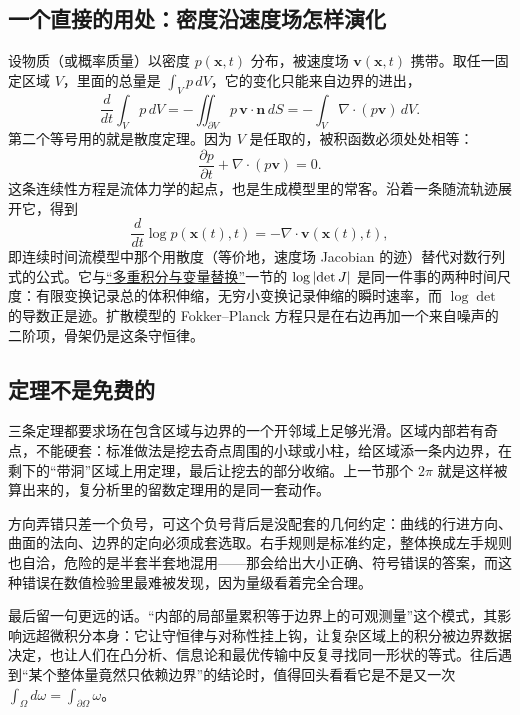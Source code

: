 \subsection{一个直接的用处：密度沿速度场怎样演化}

设物质（或概率质量）以密度 \(p(\mathbf x,t)\) 分布，被速度场 \(\mathbf v(\mathbf x,t)\) 携带。取任一固定区域 \(V\)，里面的总量是 \(\int_V p\,dV\)，它的变化只能来自边界的进出，
\[
\frac{d}{dt}\int_V p\,dV=-\iint_{\partial V}p\,\mathbf v\cdot\mathbf n\,dS
=-\int_V\nabla\cdot(p\mathbf v)\,dV .
\]
第二个等号用的就是散度定理。因为 \(V\) 是任取的，被积函数必须处处相等：
\[
\frac{\partial p}{\partial t}+\nabla\cdot(p\mathbf v)=0 .
\]
这条连续性方程是流体力学的起点，也是生成模型里的常客。沿着一条随流轨迹展开它，得到
\[
\frac{d}{dt}\log p(\mathbf x(t),t)=-\nabla\cdot\mathbf v(\mathbf x(t),t),
\]
即连续时间流模型中那个用散度（等价地，速度场 Jacobian 的迹）替代对数行列式的公式。它与\hyperref[sec:02-Calculus/06-Multivariable-Calculus/07]{``多重积分与变量替换''}一节的 \(\log\left|\det J\right|\) 是同一件事的两种时间尺度：有限变换记录总的体积伸缩，无穷小变换记录伸缩的瞬时速率，而 \(\log\det\) 的导数正是迹。扩散模型的 Fokker--Planck 方程只是在右边再加一个来自噪声的二阶项，骨架仍是这条守恒律。

\subsection{定理不是免费的}

三条定理都要求场在包含区域与边界的一个开邻域上足够光滑。区域内部若有奇点，不能硬套：标准做法是挖去奇点周围的小球或小柱，给区域添一条内边界，在剩下的``带洞''区域上用定理，最后让挖去的部分收缩。上一节那个 \(2\pi\) 就是这样被算出来的，复分析里的留数定理用的是同一套动作。

方向弄错只差一个负号，可这个负号背后是没配套的几何约定：曲线的行进方向、曲面的法向、边界的定向必须成套选取。右手规则是标准约定，整体换成左手规则也自洽，危险的是半套半套地混用——那会给出大小正确、符号错误的答案，而这种错误在数值检验里最难被发现，因为量级看着完全合理。

最后留一句更远的话。``内部的局部量累积等于边界上的可观测量''这个模式，其影响远超微积分本身：它让守恒律与对称性挂上钩，让复杂区域上的积分被边界数据决定，也让人们在凸分析、信息论和最优传输中反复寻找同一形状的等式。往后遇到``某个整体量竟然只依赖边界''的结论时，值得回头看看它是不是又一次 \(\int_\Omega d\omega=\int_{\partial\Omega}\omega\)。
